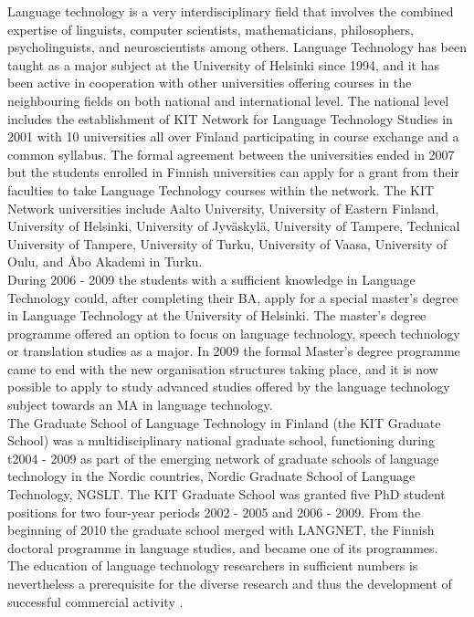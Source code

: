 \begin{multicols}{2}
Language technology is a very interdisciplinary field that involves the combined expertise of linguists, computer scientists, mathematicians, philosophers, psycholinguists, and neuroscientists among others. 
Language Technology has been
taught as a major subject at the University of Helsinki since 1994, and it has
been active in cooperation with other universities offering courses in the
neighbouring fields on both national and international level. The national
level includes the establishment of KIT Network for Language Technology Studies
in 2001 with 10 universities all over Finland participating in course exchange
and a common syllabus. The formal agreement between the universities ended in
2007 but the students enrolled in Finnish universities can apply for a grant
from their faculties to take Language Technology courses within the network.
The KIT Network universities include Aalto University, University of Eastern
Finland, University of Helsinki, University of Jyväskylä, University of Tampere, Technical University of
Tampere, University of Turku, University of Vaasa, University of Oulu, and Åbo
Akademi in Turku.\\
During 2006 - 2009 the students with a sufficient knowledge in Language
Technology could, after completing their BA, apply for a special master's
degree in Language Technology at the University of Helsinki. The master's
degree programme offered an option to focus on language technology, speech
technology or translation studies as a major. In 2009 the formal Master's
degree programme came to end with the new organisation structures taking place,
and it is now possible to apply to study advanced studies offered by the
language technology subject towards an MA in language technology.\\
The Graduate School of Language Technology in Finland (the KIT Graduate School)
was a multidisciplinary national graduate school, functioning during t2004 -
2009 as part of the emerging network of graduate schools of language technology
in the Nordic countries, Nordic Graduate School of Language Technology, NGSLT.
The KIT Graduate School was granted five PhD student positions for two
four-year periods 2002 - 2005 and 2006 - 2009. From the beginning of 2010 the
graduate school merged with LANGNET, the Finnish doctoral programme in language
studies, and became one of its programmes.\\
The education of language technology researchers in sufficient numbers
is nevertheless a prerequisite for the diverse research and thus the
development of successful commercial activity \cite{FinExp}.


\end{multicols}
